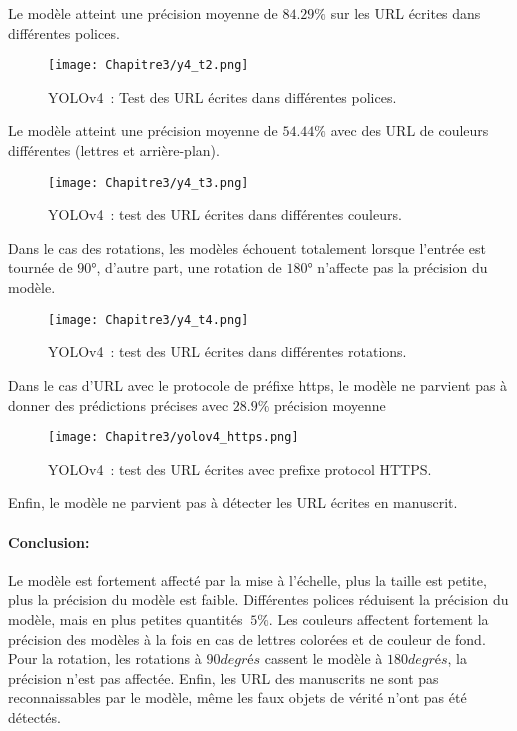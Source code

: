      Le modèle atteint une précision moyenne de $84.29\%$ sur les URL écrites dans différentes polices.
     \begin{figure}[H]
               \centering
               \texttt{[image: Chapitre3/y4\_t2.png]}
               \caption{YOLOv4 : Test des URL écrites dans différentes polices.}
               \label{y4_t2}
               \end{figure}

     Le modèle atteint une précision moyenne de $54.44\%$ avec des URL de couleurs différentes (lettres et arrière-plan).
     \begin{figure}[H]
               \centering
               \texttt{[image: Chapitre3/y4\_t3.png]}
               \caption{YOLOv4 : test des URL écrites dans différentes couleurs.}
               \label{y4_t3}
               \end{figure}

     Dans le cas des rotations, les modèles échouent totalement lorsque l'entrée est tournée de $90°$, d'autre part, une rotation de $180°$ n'affecte pas la précision du modèle.
     \begin{figure}[H]
               \centering
               \texttt{[image: Chapitre3/y4\_t4.png]}
               \caption{YOLOv4 : test des URL écrites dans différentes rotations.}
               \label{y4_t4}
               \end{figure}
     
     Dans le cas d'URL avec le protocole de préfixe https, le modèle ne parvient pas à donner des prédictions précises avec $28.9\%$ précision moyenne
     \begin{figure}[H]
               \centering
               \texttt{[image: Chapitre3/yolov4\_https.png]}
               \caption{YOLOv4 : test des URL écrites avec prefixe protocol HTTPS.}
               \label{y4_https}
               \end{figure}
     
     Enfin, le modèle ne parvient pas à détecter les URL écrites en manuscrit.
     \paragraph{Conclusion:} Le modèle est fortement affecté par la mise à l'échelle, plus la taille est petite, plus la précision du modèle est faible. Différentes polices réduisent la précision du modèle, mais en plus petites quantités $~ 5\%$. Les couleurs affectent fortement la précision des modèles à la fois en cas de lettres colorées et de couleur de fond. Pour la rotation, les rotations à $90 degrés$ cassent le modèle à $180 degrés$, la précision n'est pas affectée. Enfin, les URL des manuscrits ne sont pas reconnaissables par le modèle, même les faux objets de vérité n'ont pas été détectés.
     
